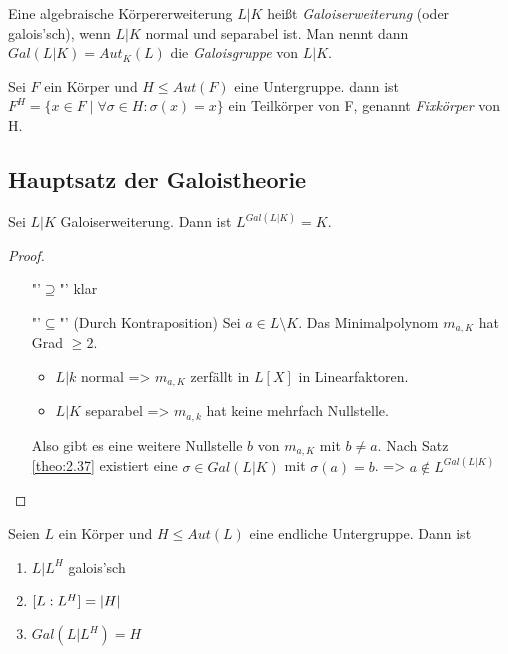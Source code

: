 \documentclass[../main.tex]{subfiles}
\begin{document}
\begin{definition}
    Eine algebraische Körpererweiterung $L|K$ heißt \emph{Galoiserweiterung} (oder galois'sch), wenn $L|K$ normal und separabel ist.
    Man nennt dann $Gal(L|K) = Aut_K(L)$ die \emph{Galoisgruppe} von $L|K$.

    Sei $F$ ein Körper und $H\leq Aut(F)$ eine Untergruppe.
    dann ist $F^H = \{x\in F\mid \forall\sigma\in H:\sigma(x) = x\}$ ein Teilkörper von F, genannt \emph{Fixkörper} von H.
\end{definition}
\subsection{Hauptsatz der Galoistheorie}
\begin{lemma} \label{theo:3.2}
    Sei $L|K$ Galoiserweiterung. Dann ist $L^{Gal(L|K)} = K$.
\end{lemma}
\begin{proof}$ $
    \begin{enumerate}
        \item["'$\supseteq$"'] klar
        \item["'$\subseteq$"'] (Durch Kontraposition) Sei $a\in L\setminus K$. Das Minimalpolynom $m_{a,K}$ hat Grad $\geq2$.
        \begin{itemize}
            \item $L|k$ normal => $m_{a,K}$ zerfällt in $L[X]$ in Linearfaktoren.
            \item $L|K$ separabel => $m_{a,k}$ hat keine mehrfach Nullstelle.
        \end{itemize}
    
        Also gibt es eine weitere Nullstelle $b$ von $m_{a,K}$ mit $b\neq a$.
        Nach Satz \cref{theo:2.37} existiert eine $\sigma \in Gal(L|K)$ mit $\sigma(a)=b$.
        => $a\notin L^{Gal(L|K)}$
    \end{enumerate}
\end{proof}
\begin{theorem} \label{theo:3.3}
    Seien $L$ ein Körper und $H\leq Aut(L)$ eine endliche Untergruppe.
    Dann ist
    \begin{enumerate}
        \item $L|L^H$ galois'sch
        \item $[L:L^H] = \left\vert H \right\vert$
        \item $Gal(L|L^H) = H$
    \end{enumerate}
\end{theorem}
\end{document}
